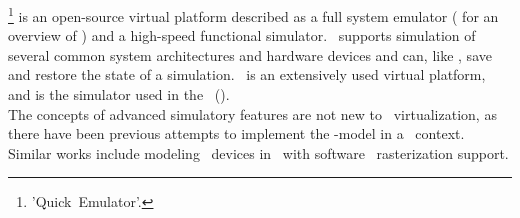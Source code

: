 \noindent
\termqemu \footnote{'Quick~Emulator'.} is an open-source virtual platform described as a full system emulator ( for an overview of \termqemu ) and a high-speed functional simulator.
\termqemu\ supports simulation of several common system architectures and hardware devices and can, like \termsimics , save and restore the state of a simulation.
\termqemu\ is an extensively used virtual platform, and is the simulator used in the \termrefsolu\ ().\\

\noindent
The concepts of advanced simulatory features are not new to \termgpu\ virtualization, as there have been previous attempts to implement the \termcheckpointrestart -model in a \termgpu\ context.
Similar works include modeling \termgpu\ devices in \termqemu\ with software \termopengles\ rasterization support.


